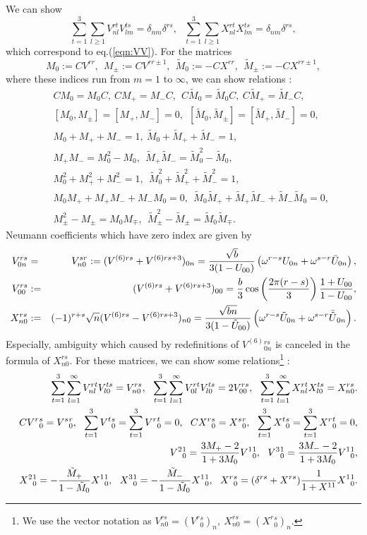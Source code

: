 \documentclass[12pt,a4paper]{article}
\def\M0{{\tilde M}_0}
\def\Mp{{\tilde M}_+}
\def\Mm{{\tilde M}_-}
\begin{document}
We can show
\begin{equation}
\sum_{t=1}^3\sum_{l\geq1}V_{nl}^{rt}V_{lm}^{ts}=\delta_{nm}\delta^{rs},\ \ \ 
\sum_{t=1}^3\sum_{l\geq1}X_{nl}^{rt}X_{lm}^{ts}=\delta_{nm}\delta^{rs},
\end{equation}
which correspond to eq.(\ref{eqn:VV}). For the matrices
\begin{equation}
M_0:=CV^{rr},\ \ M_{\pm}:=CV^{rr\pm1},\ \ {\tilde M}_0:=-CX^{rr},\ \ {\tilde M}_{\pm}:=-CX^{rr\pm1},
\end{equation}
where these indices run from $m=1$ to $\infty$, we can show relations :
\begin{eqnarray}
\label{eqn:MMT}
&&CM_0=M_0C,\ CM_+=M_-C,\ \ C\M0 =\M0 C,\ C\Mp =\Mm C,\nonumber \\
&&[M_0,M_{\pm}]=[M_+,M_-]=0,\ \ [{\tilde M}_0,{\tilde M}_{\pm}]=[{\tilde M}_+,{\tilde M}_-]=0,\nonumber \\
&&M_0+M_++M_-=1,\ {\tilde M}_0+{\tilde M}_++{\tilde M}_-=1,\nonumber \\
&&M_+M_-=M_0^2-M_0,\ \ {\tilde M}_+{\tilde M}_-={\tilde M}_0^2-{\tilde M}_0,\nonumber \\
&&M_0^2+M_+^2+M_-^2=1,\ \ \M0^2+\Mp^2+\Mm^2=1,\nonumber \\
&&M_0M_+ +M_+M_- +M_- M_0=0,\ \ \M0 \Mp +\Mp \Mm +\Mm \M0=0, \nonumber \\
&&M_\pm^2-M_\pm=M_0M_\mp ,\ \ {\tilde M}_\pm^2-{\tilde M}_\pm=\M0 {\tilde M}_\mp.
\end{eqnarray}
Neumann coefficients which have zero index are given by
\begin{eqnarray}
V_{0n}^{rs}&=&V_{n0}^{sr}:=(V^{(6)rs}+V^{(6)rs+3})_{0n}={\sqrt b\over3(1-U_{00})}\left(\omega^{r-s}U_{0n}+\omega^{s-r}{\bar U}_{0n}\right), \nonumber \\
V_{00}^{rs}&:=&(V^{(6)rs}+V^{(6)rs+3})_{00}={b\over3}\cos\left({2\pi(r-s)\over3}\right){1+U_{00}\over1-U_{00}}, \nonumber \\
X_{n0}^{rs}&:=&(-1)^{r+s}\sqrt n(V^{(6)rs}-V^{(6)rs+3})_{n0}
={\sqrt{bn}\over3(1-{\tilde U}_{00})}\left(\omega^{r-s}{\tilde U}_{0n}+\omega^{s-r}{\bar {\tilde U}}_{0n}\right).
\end{eqnarray}
Especially, ambiguity which caused by redefinitions of $V^{(6)}{}^{rs}_{0n}$ is canceled in the formula of $X^{rs}_{n0}$.
For these matrices, we can show some relations\footnote{
We use the vector notation as $V^{rs}_{n0}=(V^r{}^s_0)_n,\ X^{rs}_{n0}=(X^r{}^s_0)_n$.
} :
\begin{eqnarray}
\label{eqn:VXTT}
&&\sum_{t=1}^3\sum_{l=1}^\infty V^{rt}_{nl}V_{l0}^{ts}=V_{n0}^{rs},\ \ 
\sum_{t=1}^3\sum_{l=1}^\infty V^{rt}_{0l}V_{l0}^{ts}=2V_{00}^{rs},\ \ 
\sum_{t=1}^3\sum_{l=1}^\infty X^{rt}_{nl}X^{ts}_{l0}=X_{n0}^{rs}.\nonumber \\
&& CV^r{}^s_0=V^s{}^r_0,\ \ \sum_{t=1}^3 V^t{}^s_0=\sum_{t=1}^3V^r{}^t_0=0,\ \ 
CX^r{}^s_0=X^s{}^r_0,\ \ \sum_{t=1}^3 X^t{}^s_0=\sum_{t=1}^3X^r{}^t_0=0,\nonumber \\
&&V^2{}^1_0={3M_+ -2\over1+3M_0}V^1{}^1_0,\ \ V^3{}^1_0={3M_- -2\over1+3M_0}V^1{}^1_0,\nonumber \\
&&X^2{}^1_0=-{\Mp \over1-\M0 }X^1{}^1_0,\ \ X^3{}^1_0=-{\Mm \over1-\M0 }X^1{}^1_0,\ \ 
X^r{}^s_0=(\delta^{rs}+X^{rs}){1\over1+X^{11}}X^1{}^1_0.
\end{eqnarray}
\end{document}
